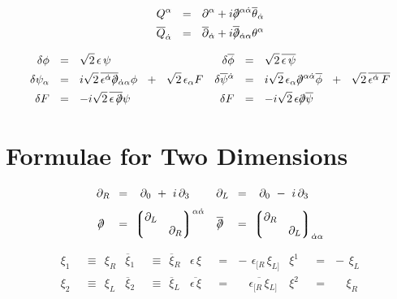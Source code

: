 \documentclass[14pt]{article}
\newcommand{\p}{\partial}
\newcommand{\ov}{\overline}
\newcommand{\lgr}{\left\lgroup}
\newcommand{\rgr}{\right\rgroup}
\def\slashed#1{\setbox0=\hbox{$#1$}             %
   \dimen0=\wd0                                 %
   \setbox1=\hbox{/} \dimen1=\wd1               %
   \ifdim\dimen0>\dimen1                        %
      \rlap{\hbox to \dimen0{\hfil/\hfil}}      %
      #1                                        %
   \else                                        %
      \rlap{\hbox to \dimen1{\hfil$#1$\hfil}}   %
      /                                         %
   \fi}                                         %
\begin{document}
\begin{align*}
   Q^\alpha & ~~=~~  \partial^\alpha +
            i \slashed{\partial}^{\alpha\dot{\alpha}}
	    \overline{\theta}_{\dot{\alpha}}   \\
   \overline{Q}_{\dot{\alpha}} & ~~=~~ \overline{\partial}_{\dot{\alpha}} +
            i \ov{\slashed{\partial}}{}_{\dot{\alpha}\alpha}\theta^\alpha 
\end{align*}

\begin{align*}
	\delta\phi & ~~=~~ \sqrt{2}\, \epsilon\, \psi     &  
		\delta \ov{\phi} & ~~=~~ \sqrt{2}\, \ov{\epsilon\, \psi}\\
	\delta\psi_\alpha & ~~=~~ i\sqrt{2}\, 
			\ov{\epsilon^{\dot{\alpha}} \slashed{\p}}{}_{\dot{\alpha}\alpha} \phi 
			~~+~~ \sqrt{2}\, \epsilon_\alpha F 
&
		\delta \ov{\psi}{}^{\dot{\alpha}} & ~~=~~ 
			i\sqrt{2}\, \epsilon_\alpha \slashed{\p}^{\alpha\dot{\alpha}} \ov{\phi} 
			~~+~~ \sqrt{2}\, \ov{\epsilon^{\dot{\alpha}}\, F} \\
	\delta F & ~~=~~ -i \sqrt{2}\, \ov{\epsilon\, \slashed{\p}} \psi  &
		\delta F & ~~=~~ -i \sqrt{2}\, \epsilon\slashed{\p} \ov{\psi}
\end{align*}


\pagebreak
\section*{\centering Formulae for Two Dimensions}
\vspace{3mm}

\begin{align*}
	\p_R \!\!\! &  ~~~=~ ~\, \p_0 ~+~ i\, \p_3 
	&
	\p_L \!\!\! &  ~~~=~ ~\, \p_0 ~-~ i\, \p_3 
	\\[1mm]
	\slashed\p & ~~~=~ \lgr \begin{matrix}  \p_L  &       \\
						      & \p_R 
			   \end{matrix} \rgr^{\alpha\dot\alpha}
	&
	\ov{\slashed\p} & ~~~=~ \lgr \begin{matrix}  \p_R  &       \\
                                                           & \p_L				
				\end{matrix} \rgr_{\dot\alpha\alpha}
\end{align*}

\begin{align*}
	\xi_1 & ~~\equiv~~ \xi_R  
	&
	\ov\xi{}_1 & ~~\equiv~~ \ov\xi{}_R
	&
	\epsilon\,\xi & ~~=~~ -\, \epsilon_{[R}\, \xi_{L]}
	&
	\xi^1 & ~~=~~ -\, \xi_L
	\\[2mm]
	\xi_2 & ~~\equiv~~ \xi_L
	&
	\ov\xi{}_2 & ~~\equiv~~ \ov\xi{}_L
	&
	\ov{\epsilon\, \xi} & ~~=~~ \phantom{-\,\ } 
				\ov{\epsilon_{[R}\, \xi}{}_{L]}
	&
	\xi^2 & ~~=~~ \phantom{-\,\ }
		      \xi_R
\end{align*}
\end{document}
